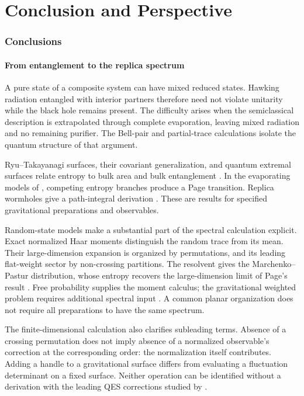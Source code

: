 \documentclass[11pt,letterpaper]{article}
\theoremstyle{plain}
\theoremstyle{definition}
\theoremstyle{remark}
\begin{document}
\part{Conclusion and Perspective}
\section{Conclusions}
\label{sec15:summary}
\label{sec15:punchline}

\subsection{From entanglement to the replica spectrum}
\label{subsec15:chain}

A pure state of a composite system can have mixed reduced states. Hawking
radiation entangled with interior partners therefore need not violate
unitarity while the black hole remains present. The difficulty arises when
the semiclassical description is extrapolated through complete evaporation,
leaving mixed radiation and no remaining purifier. The Bell-pair and
partial-trace calculations isolate the quantum structure of that argument.

Ryu--Takayanagi surfaces, their covariant generalization, and quantum extremal
surfaces relate entropy to bulk area and bulk entanglement
\citep{ryutakayanagi2006,hubenyetal2007,engelhardtwall2015}. In the evaporating
models of \citet{penington2020,almheirietal2019,almheirietal2020islands},
competing entropy branches produce a Page transition. Replica wormholes give
a path-integral derivation \citep{pssyetal2022,ahmstetal2020}. These are
results for specified gravitational preparations and observables.

Random-state models make a substantial part of the spectral calculation
explicit. Exact normalized Haar moments distinguish the random trace from
its mean. Their large-dimension expansion is organized by permutations,
and its leading flat-weight sector by non-crossing partitions. The
resolvent gives the Marchenko--Pastur distribution, whose entropy recovers
the large-dimension limit of Page's result
\citep{page1993,marchenkopastur1967}. Free probability supplies the moment
calculus; the gravitational weighted problem requires additional spectral
input \citep{wang2023,chengetal2024}. A common planar organization does
not require all preparations to have the same spectrum.

The finite-dimensional calculation also clarifies subleading terms.
Absence of a crossing permutation does not imply absence of a normalized
observable's correction at the corresponding order: the normalization
itself contributes. Adding a handle to a gravitational surface differs from
evaluating a fluctuation determinant on a fixed surface. Neither operation
can be identified without a derivation with the leading QES corrections
studied by \citet{akerspenington2021}.
\end{document}
